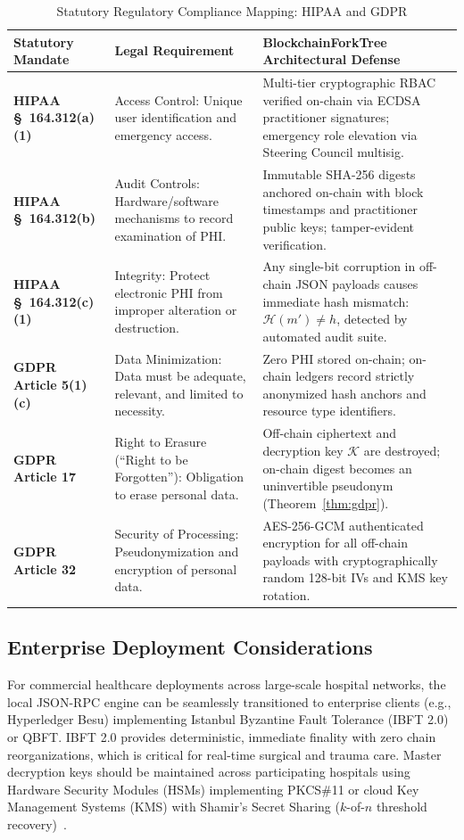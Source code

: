 \documentclass[journal]{IEEEtran}
\theoremstyle{definition}
\begin{document}
\begin{table}[t]
\centering
\caption{Statutory Regulatory Compliance Mapping: HIPAA and GDPR}
\label{tab:compliance}
\begin{tabularx}{\textwidth}{p{3.8cm}p{4.2cm}p{7.8cm}}
\toprule
\textbf{Statutory Mandate} & \textbf{Legal Requirement} & \textbf{BlockchainForkTree Architectural Defense} \\
\midrule
\textbf{HIPAA \S~164.312(a)(1)} & Access Control: Unique user identification and emergency access. & Multi-tier cryptographic RBAC verified on-chain via ECDSA practitioner signatures; emergency role elevation via Steering Council multisig. \\
\addlinespace
\textbf{HIPAA \S~164.312(b)} & Audit Controls: Hardware/software mechanisms to record examination of PHI. & Immutable SHA-256 digests anchored on-chain with block timestamps and practitioner public keys; tamper-evident verification. \\
\addlinespace
\textbf{HIPAA \S~164.312(c)(1)} & Integrity: Protect electronic PHI from improper alteration or destruction. & Any single-bit corruption in off-chain JSON payloads causes immediate hash mismatch: $\mathcal{H}(m') \neq h$, detected by automated audit suite. \\
\addlinespace
\textbf{GDPR Article 5(1)(c)} & Data Minimization: Data must be adequate, relevant, and limited to necessity. & Zero PHI stored on-chain; on-chain ledgers record strictly anonymized hash anchors and resource type identifiers. \\
\addlinespace
\textbf{GDPR Article 17} & Right to Erasure (``Right to be Forgotten''): Obligation to erase personal data. & Off-chain ciphertext and decryption key $\mathcal{K}$ are destroyed; on-chain digest becomes an uninvertible pseudonym (Theorem~\ref{thm:gdpr}). \\
\addlinespace
\textbf{GDPR Article 32} & Security of Processing: Pseudonymization and encryption of personal data. & AES-256-GCM authenticated encryption for all off-chain payloads with cryptographically random 128-bit IVs and KMS key rotation. \\
\bottomrule
\end{tabularx}
\end{table}

\subsection{Enterprise Deployment Considerations}
For commercial healthcare deployments across large-scale hospital networks, the local JSON-RPC engine can be seamlessly transitioned to enterprise clients (e.g., Hyperledger Besu) implementing Istanbul Byzantine Fault Tolerance (IBFT 2.0)~\cite{saltini2020ibft} or QBFT. IBFT 2.0 provides deterministic, immediate finality with zero chain reorganizations, which is critical for real-time surgical and trauma care. Master decryption keys should be maintained across participating hospitals using Hardware Security Modules (HSMs) implementing PKCS\#11 or cloud Key Management Systems (KMS) with Shamir's Secret Sharing ($k$-of-$n$ threshold recovery)~\cite{shamir1979share}.
\end{document}
